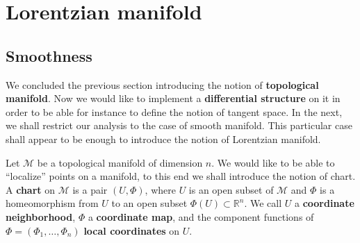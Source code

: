 \documentclass[11pt]{book}
\newcommand{\Mcal}{\mathcal{M}}
\newcommand{\Rbb}{\mathbb{R}}
\theoremstyle{break}
\begin{document}
\section{Lorentzian manifold}
\label{p:LORENTZ_M}


\subsection{Smoothness}
\label{p:SMOOTH_M}


We concluded the previous section introducing the notion of \textbf{topological manifold}. Now we would like to implement a \textbf{differential structure} on it in order to be able for instance to define the notion of tangent space. In the next, we shall restrict our analysis to the case of smooth manifold. This particular case shall appear to be enough to introduce the notion of Lorentzian manifold.


\bigskip


Let $\Mcal$ be a topological manifold of dimension $n$. We would like to be able to ``localize'' points on a manifold, to this end we shall introduce the notion of chart. A \textbf{chart} on $\Mcal$ is a pair $(U,\Phi)$, where $U$ is an open subset of $\Mcal$ and $\Phi$ is a homeomorphism from $U$ to an open subset $\Phi(U) \subset \Rbb^n$. We call $U$ a \textbf{coordinate neighborhood}, $\Phi$ a \textbf{coordinate map}, and the component functions of $\Phi=(\Phi_1,\dots,\Phi_n)$ \textbf{local coordinates} on $U$.
\end{document}
